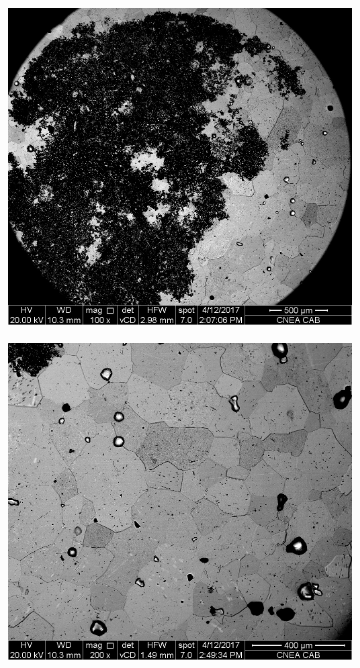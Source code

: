 \documentclass[a4paper,12pt,fleqn,twoside,openany]{book}
\begin{document}
\begin{figure}
\begin{subfigure}{0.3\textwidth}
        \includegraphics[width=\textwidth]{Img/Resultados/clavos/Clavo1Retro.jpg}
        \caption{}%
        \label{fig: SEM1Clavo1}
    \end{subfigure}
        \begin{subfigure}{0.3\textwidth}
        \includegraphics[width=\textwidth]{Img/Resultados/clavos/Clavo1Retro2.jpg}

\end{subfigure}
\end{figure}
\end{document}
